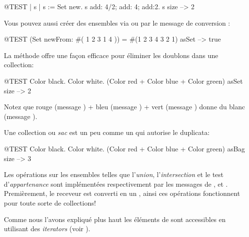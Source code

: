 \documentclass[a4paper,10pt,twoside]{book}
\begin{document}
\begin{code}{@TEST | s | }
s := Set new.
s add: 4/2; add: 4; add:2.
s size --> 2
\end{code}

Vous pouvez aussi cr\'eer des ensembles via  ou
par le message de conversion :

\begin{code}{@TEST}
(Set newFrom: #( 1 2 3 1 4 )) = #(1 2 3 4 3 2 1) asSet --> true
\end{code}

La m\'ethode  offre une fa\c{c}on efficace pour \'eliminer les doublons dans une collection:
\begin{code}{@TEST}
{ Color black. Color white. (Color red + Color blue + Color green) } asSet size --> 2
\end{code}
\noindent
Notez que rouge (message ) + bleu (message ) + vert (message ) donne du blanc (message ).

Une collection  ou \emph{sac} est un peu comme un  
qui autorise le duplicata:
\begin{code}{@TEST}
{ Color black. Color white. (Color red + Color blue + Color green) } asBag size --> 3
\end{code}

Les op\'erations sur les ensembles telles que
l'\emph{union}, l'\emph{intersection} et le test d'\emph{appartenance} 
sont impl\'ement\'ees respectivement par les messages de  ,  et .
Premi\`erement, le receveur est converti en un , ainsi ces
op\'erations fonctionnent pour toute sorte de collections!



Comme nous l'avons expliqu\'e plus haut les \'el\'ements de  sont
accessibles en utilisant des \emph{iterators} (voir ).

\end{document}
